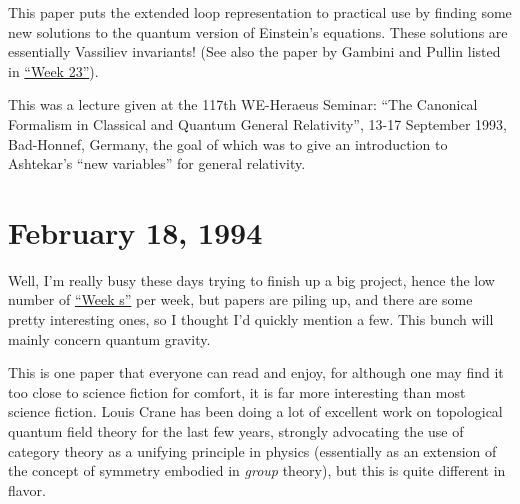 \documentclass{article}
\def\tightlist{}
\renewcommand{\texttt}[1]{%
  \begingroup
  \ttfamily
  \begingroup\lccode`~=`/\lowercase{\endgroup\def~}{/\discretionary{}{}{}}%
  \begingroup\lccode`~=`[\lowercase{\endgroup\def~}{[\discretionary{}{}{}}%
  \begingroup\lccode`~=`.\lowercase{\endgroup\def~}{.\discretionary{}{}{}}%
  \catcode`/=\active\catcode`[=\active\catcode`.=\active
  \scantokens{#1\noexpand}%
  \endgroup
}
\begin{document}
This paper puts the extended loop representation to practical use by
finding some new solutions to the quantum version of Einstein's
equations. These solutions are essentially Vassiliev invariants! (See
also the paper by Gambini and Pullin listed in
\protect\hyperlink{week23}{``Week 23''}).


This was a lecture given at the 117th WE-Heraeus Seminar: ``The
Canonical Formalism in Classical and Quantum General Relativity'', 13-17
September 1993, Bad-Honnef, Germany, the goal of which was to give an
introduction to Ashtekar's ``new variables'' for general relativity.
\hypertarget{week31}{%
\section{February 18, 1994}\label{week31}}

Well, I'm really busy these days trying to finish up a big project,
hence the low number of \protect\hyperlink{weeks}{``Week s''} per week,
but papers are piling up, and there are some pretty interesting ones, so
I thought I'd quickly mention a few. This bunch will mainly concern
quantum gravity.


This is one paper that everyone can read and enjoy, for although one may
find it too close to science fiction for comfort, it is far more
interesting than most science fiction. Louis Crane has been doing a lot
of excellent work on topological quantum field theory for the last few
years, strongly advocating the use of category theory as a unifying
principle in physics (essentially as an extension of the concept of
symmetry embodied in \emph{group} theory), but this is quite different
in flavor.
\end{document}
